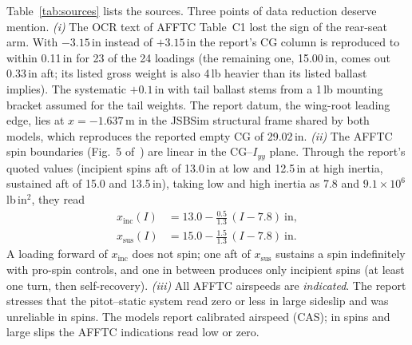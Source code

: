 \documentclass[10pt,a4paper,twocolumn]{article}
\begin{document}
Table~\ref{tab:sources} lists the sources. Three points of data reduction deserve mention.
\emph{(i)} The OCR text of AFFTC Table~C1 lost the sign of the rear-seat arm. With $-3.15$\,in instead of $+3.15$\,in the
report's CG column is reproduced to within 0.11\,in for 23 of the 24 loadings (the remaining one, 15.00\,in, comes out 0.33\,in aft; its listed gross weight is also 4\,lb heavier than its listed ballast implies). The systematic $+0.1$\,in with tail ballast stems from a 1\,lb mounting bracket assumed for the tail weights. The report datum, the wing-root leading edge, lies at
$x=-1.637$\,m in the JSBSim structural frame shared by both models, which reproduces the reported empty CG of 29.02\,in.
\emph{(ii)} The AFFTC spin boundaries (Fig.~5 of~\cite{afftc}) are linear in the CG--$I_{yy}$ plane. Through the report's quoted values (incipient spins aft of 13.0\,in at low and 12.5\,in at high inertia, sustained aft of 15.0 and 13.5\,in), taking low and high inertia as 7.8 and $9.1\times10^6$\,lb\,in$^2$, they read
\begin{align}
x_\text{inc}(I) &= 13.0 - \tfrac{0.5}{1.3}\,(I-7.8)\ \text{in}, \label{eq:inc}\\
x_\text{sus}(I) &= 15.0 - \tfrac{1.5}{1.3}\,(I-7.8)\ \text{in}. \label{eq:sus}
\end{align}
A loading forward of $x_\text{inc}$ does not spin; one aft of $x_\text{sus}$ sustains a spin indefinitely with pro-spin controls,
and one in between produces only incipient spins (at least one turn, then self-recovery).
\emph{(iii)} All AFFTC airspeeds are \emph{indicated}. The report stresses that the pitot--static system read zero or less in large
sideslip and was unreliable in spins. The models report calibrated airspeed (CAS); in spins and large slips the AFFTC indications read low or zero.

\end{document}
